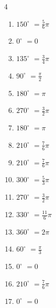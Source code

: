 \begin{multicols}{4}
\begin{enumerate}
  \item $\displaystyle 150^{\circ}$
        $\displaystyle =\frac{5}{6}\pi$

  \item $\displaystyle 0^{\circ}$
        $\displaystyle =0$

  \item $\displaystyle 135^{\circ}$
        $\displaystyle =\frac{3}{4}\pi$

  \item $\displaystyle 90^{\circ}$
        $\displaystyle =\frac{\pi}{2}$

  \item $\displaystyle 180^{\circ}$
        $\displaystyle =\pi$

  \item $\displaystyle 270^{\circ}$
        $\displaystyle =\frac{3}{2}\pi$

  \item $\displaystyle 180^{\circ}$
        $\displaystyle =\pi$

  \item $\displaystyle 210^{\circ}$
        $\displaystyle =\frac{7}{6}\pi$

  \item $\displaystyle 210^{\circ}$
        $\displaystyle =\frac{7}{6}\pi$

\columnbreak %

  \item $\displaystyle 300^{\circ}$
        $\displaystyle =\frac{5}{3}\pi$

  \item $\displaystyle 270^{\circ}$
        $\displaystyle =\frac{3}{2}\pi$

  \item $\displaystyle 330^{\circ}$
        $\displaystyle =\frac{11}{6}\pi$

  \item $\displaystyle 360^{\circ}$
        $\displaystyle =2\pi$

  \item $\displaystyle 60^{\circ}$
        $\displaystyle =\frac{\pi}{3}$

  \item $\displaystyle 0^{\circ}$
        $\displaystyle =0$

  \item $\displaystyle 210^{\circ}$
        $\displaystyle =\frac{7}{6}\pi$

  \item $\displaystyle 0^{\circ}$
        $\displaystyle =0$


\end{enumerate}
\end{multicols}
